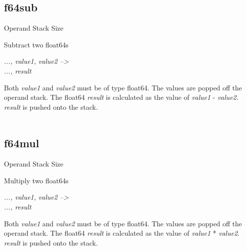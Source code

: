 \documentclass[12pt]{article}
\begin{document}
		\subsection*{f64sub}
			\begin{labeling}{Operand Stack Size}
				\item [\textbf{Operation}] Subtract two float64s
				\item [\textbf{Format}] 
				\item [\textbf{Operand Stack}] \textit{..., value1, value2 --\textgreater} \\
										\textit{..., result}
				\item [\textbf{Description}] Both \textit{value1} and \textit{value2} must be of type float64. The values are popped off the operand stack. The float64 \textit{result} is calculated as the value of \textit{value1} - \textit{value2}. \textit{result} is pushed onto the stack. \\ \\
			\end{labeling}	
		\newpage
		
		\subsection*{f64mul}
			\begin{labeling}{Operand Stack Size}
				\item [\textbf{Operation}] Multiply two float64s
				\item [\textbf{Format}] 
				\item [\textbf{Operand Stack}] \textit{..., value1, value2 --\textgreater} \\
										\textit{..., result}
				\item [\textbf{Description}] Both \textit{value1} and \textit{value2} must be of type float64. The values are popped off the operand stack. The float64 \textit{result} is calculated as the value of \textit{value1} * \textit{value2}. \textit{result} is pushed onto the stack. \\ \\
			\end{labeling}	
		\newpage
		
\end{document}
